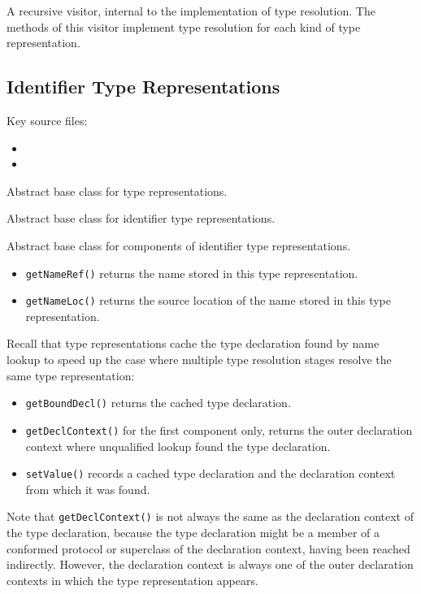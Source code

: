 \documentclass[../generics]{subfiles}
\begin{document}
A recursive visitor, internal to the implementation of type resolution. The methods of this visitor implement type resolution for each kind of type representation.

\subsection*{Identifier Type Representations}

Key source files:
\begin{itemize}
\item {}
\item {}
\end{itemize}

Abstract base class for type representations.

Abstract base class for identifier type representations.

Abstract base class for components of identifier type representations.
\begin{itemize}
\item \texttt{getNameRef()} returns the name stored in this type representation.
\item \texttt{getNameLoc()} returns the source location of the name stored in this type representation.
\end{itemize}
Recall that type representations cache the type declaration found by name lookup to speed up the case where multiple type resolution stages resolve the same type representation:
\begin{itemize}
\item \texttt{getBoundDecl()} returns the cached type declaration.
\item \texttt{getDeclContext()} for the first component only, returns the outer declaration context where unqualified lookup found the type declaration.
\item \texttt{setValue()} records a cached type declaration and the declaration context from which it was found.
\end{itemize}
Note that \texttt{getDeclContext()} is not always the same as the declaration context of the type declaration, because the type declaration might be a member of a conformed protocol or superclass of the declaration context, having been reached indirectly. However, the declaration context is always one of the outer declaration contexts in which the type representation appears.
\end{document}
